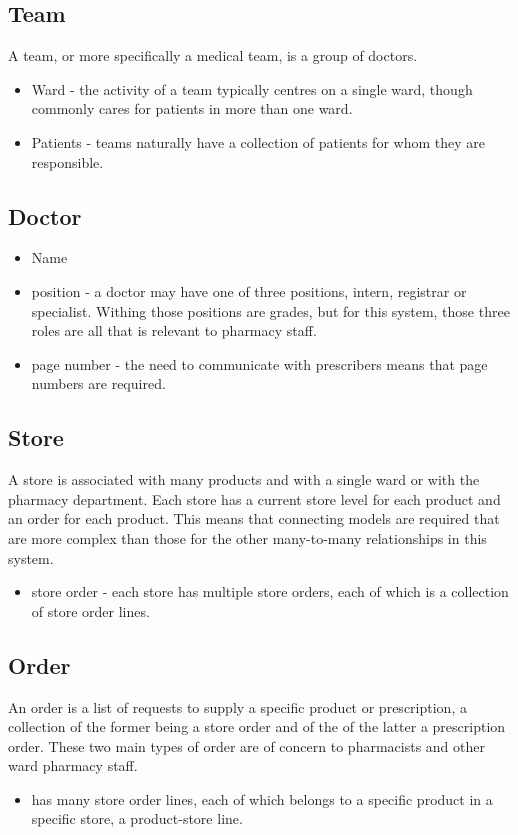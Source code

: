 \documentclass[letterpaper]{amsart}
\begin{document}
\subsection{Team}
A team, or more specifically a medical team, is a group of doctors. 
\begin{itemize}
    \item Ward - the activity of a team typically centres on a single ward, though commonly cares for patients in more than one ward. 
    \item Patients - teams naturally have a collection of patients for whom they are responsible.
\end{itemize}
\subsection{Doctor}
\begin{itemize}
    \item Name 
    \item position - a doctor may have one of three positions, intern, registrar or specialist.  Withing those positions are grades, but for this system, those three roles are all that is relevant to pharmacy staff. 
    \item page number - the need to communicate with prescribers means that page numbers are required. 
\end{itemize}
\subsection{Store}
A store is associated with many products and with a single ward or with the pharmacy department.  Each store has a current store level for each product and an order for each product.  This means that connecting models are required that are more complex than those for the other many-to-many relationships in this system.
\begin{itemize} 
    \item store order - each store has multiple store orders, each of which is a collection of store order lines.
\end{itemize}
\subsection{Order}
An order is a list of requests to supply a specific product or prescription, a collection of the former being a store order and of the of the latter a prescription order.  These two main types of order are of concern to pharmacists and other ward pharmacy staff.
\begin{itemize}
    \item has many store order lines, each of which belongs to a specific product in a specific store, a product-store line.
\end{itemize}
\end{document}
